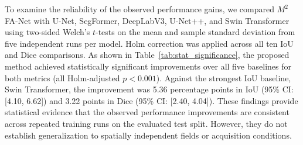 \documentclass[pdflatex,sn-mathphys-num]{sn-jnl}
\newenvironment{revblock}{\color{revisionblue}}{}
\begin{document}
\begin{table}[t]
    \centering
    \color{darkblue}
    \small
    \setlength{\tabcolsep}{4pt}
    \renewcommand{\arraystretch}{1.2}
    \caption{Statistical comparison of $M^2$FA-Net against selected baselines using two-sided Welch's $t$-tests on five independent runs. Improvements and confidence intervals are in percentage points. $p_{\mathrm{Holm}}$ is adjusted across 10 comparisons (five baselines $\times$ two metrics). The 95\% confidence intervals are unadjusted individual intervals.}
    \label{tab:stat_significance}
\end{table}

\begin{revblock}
To examine the reliability of the observed performance gains, we compared $M^2$FA-Net with U-Net, SegFormer, DeepLabV3, U-Net++, and Swin Transformer using two-sided Welch's $t$-tests on the mean and sample standard deviation from five independent runs per model. Holm correction was applied across all ten IoU and Dice comparisons. As shown in Table~\ref{tab:stat_significance}, the proposed method achieved statistically significant improvements over all five baselines for both metrics (all Holm-adjusted $p<0.001$). Against the strongest IoU baseline, Swin Transformer, the improvement was 5.36 percentage points in IoU (95\% CI: [4.10, 6.62]) and 3.22 points in Dice (95\% CI: [2.40, 4.04]). These findings provide statistical evidence
that the observed performance improvements are
consistent across repeated training runs on the
evaluated test split. However, they do not
establish generalization to spatially independent
fields or acquisition conditions.
\end{revblock}
\end{document}
